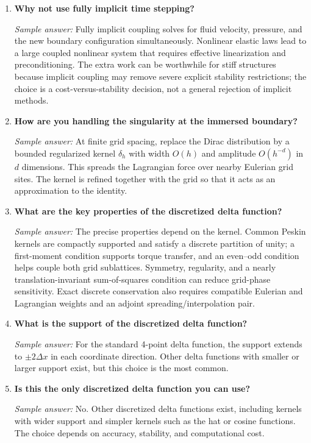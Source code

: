 \documentclass[11pt]{article}
\begin{document}
\begin{enumerate}[label=\arabic*.]
\item \textbf{Why not use fully implicit time stepping?}

\textit{Sample answer:}  
Fully implicit coupling solves for fluid velocity, pressure, and the new boundary configuration simultaneously. Nonlinear elastic laws lead to a large coupled nonlinear system that requires effective linearization and preconditioning. The extra work can be worthwhile for stiff structures because implicit coupling may remove severe explicit stability restrictions; the choice is a cost-versus-stability decision, not a general rejection of implicit methods.

\item \textbf{How are you handling the singularity at the immersed boundary?}

\textit{Sample answer:}  
At finite grid spacing, replace the Dirac distribution by a bounded regularized kernel $\delta_h$ with width $O(h)$ and amplitude $O(h^{-d})$ in $d$ dimensions. This spreads the Lagrangian force over nearby Eulerian grid sites. The kernel is refined together with the grid so that it acts as an approximation to the identity.

\item \textbf{What are the key properties of the discretized delta function?}

\textit{Sample answer:}  
The precise properties depend on the kernel. Common Peskin kernels are compactly supported and satisfy a discrete partition of unity; a first-moment condition supports torque transfer, and an even--odd condition helps couple both grid sublattices. Symmetry, regularity, and a nearly translation-invariant sum-of-squares condition can reduce grid-phase sensitivity. Exact discrete conservation also requires compatible Eulerian and Lagrangian weights and an adjoint spreading/interpolation pair.

\item \textbf{What is the support of the discretized delta function?}

\textit{Sample answer:}  
For the standard 4-point delta function, the support extends to $\pm 2\Delta x$ in each coordinate direction. Other delta functions with smaller or larger support exist, but this choice is the most common.

\item \textbf{Is this the only discretized delta function you can use?}

\textit{Sample answer:}  
No. Other discretized delta functions exist, including kernels with wider support and simpler kernels such as the hat or cosine functions. The choice depends on accuracy, stability, and computational cost.


\end{enumerate}
\end{document}
